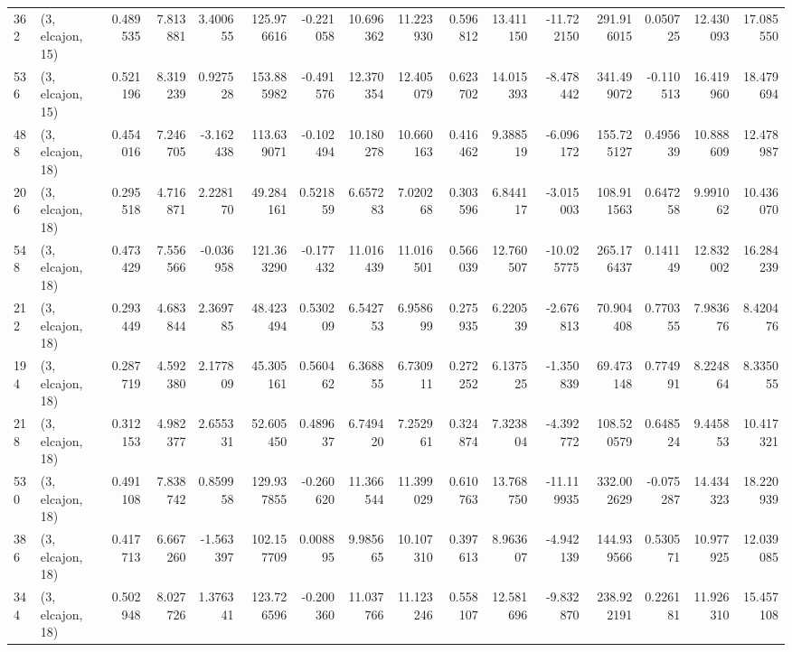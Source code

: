 \begin{tabular}{llrrrrrrrrrrrrrr}
362 &  (3, elcajon, 15) &   0.489535 &   7.813881 &   3.400655 &   125.976616 &  -0.221058 &  10.696362 &  11.223930 &  0.596812 &  13.411150 & -11.722150 &   291.916015 &  0.050725 &  12.430093 &  17.085550 \\
536 &  (3, elcajon, 15) &   0.521196 &   8.319239 &   0.927528 &   153.885982 &  -0.491576 &  12.370354 &  12.405079 &  0.623702 &  14.015393 &  -8.478442 &   341.499072 & -0.110513 &  16.419960 &  18.479694 \\
488 &  (3, elcajon, 18) &   0.454016 &   7.246705 &  -3.162438 &   113.639071 &  -0.102494 &  10.180278 &  10.660163 &  0.416462 &   9.388519 &  -6.096172 &   155.725127 &  0.495639 &  10.888609 &  12.478987 \\
206 &  (3, elcajon, 18) &   0.295518 &   4.716871 &   2.228170 &    49.284161 &   0.521859 &   6.657283 &   7.020268 &  0.303596 &   6.844117 &  -3.015003 &   108.911563 &  0.647258 &   9.991062 &  10.436070 \\
548 &  (3, elcajon, 18) &   0.473429 &   7.556566 &  -0.036958 &   121.363290 &  -0.177432 &  11.016439 &  11.016501 &  0.566039 &  12.760507 & -10.025775 &   265.176437 &  0.141149 &  12.832002 &  16.284239 \\
212 &  (3, elcajon, 18) &   0.293449 &   4.683844 &   2.369785 &    48.423494 &   0.530209 &   6.542753 &   6.958699 &  0.275935 &   6.220539 &  -2.676813 &    70.904408 &  0.770355 &   7.983676 &   8.420476 \\
194 &  (3, elcajon, 18) &   0.287719 &   4.592380 &   2.177809 &    45.305161 &   0.560462 &   6.368855 &   6.730911 &  0.272252 &   6.137525 &  -1.350839 &    69.473148 &  0.774991 &   8.224864 &   8.335055 \\
218 &  (3, elcajon, 18) &   0.312153 &   4.982377 &   2.655331 &    52.605450 &   0.489637 &   6.749420 &   7.252961 &  0.324874 &   7.323804 &  -4.392772 &   108.520579 &  0.648524 &   9.445853 &  10.417321 \\
530 &  (3, elcajon, 18) &   0.491108 &   7.838742 &   0.859958 &   129.937855 &  -0.260620 &  11.366544 &  11.399029 &  0.610763 &  13.768750 & -11.119935 &   332.002629 & -0.075287 &  14.434323 &  18.220939 \\
386 &  (3, elcajon, 18) &   0.417713 &   6.667260 &  -1.563397 &   102.157709 &   0.008895 &   9.985665 &  10.107310 &  0.397613 &   8.963607 &  -4.942139 &   144.939566 &  0.530571 &  10.977925 &  12.039085 \\
344 &  (3, elcajon, 18) &   0.502948 &   8.027726 &   1.376341 &   123.726596 &  -0.200360 &  11.037766 &  11.123246 &  0.558107 &  12.581696 &  -9.832870 &   238.922191 &  0.226181 &  11.926310 &  15.457108 \\

\end{tabular}
